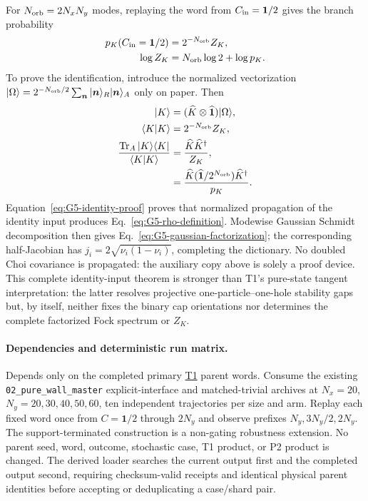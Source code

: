 \documentclass[aps,prx,twocolumn,floatfix,nofootinbib,superscriptaddress,longbibliography]{revtex4-2}
\newcommand{\code}[1]{\texttt{#1}}
\newcommand{\campref}[1]{\hyperref[camp:#1]{#1}}
\begin{document}
For $N_{\rm orb}=2N_xN_y$ modes, replaying the word from
$C_{\rm in}=\mathbf{1}/2$ gives the branch probability
\begin{equation}
 \begin{aligned}
 p_K(C_{\rm in}=\mathbf{1}/2)&=2^{-N_{\rm orb}}Z_K,\\
 \log Z_K&=N_{\rm orb}\log2+\log p_K.
 \end{aligned}
 \label{eq:G5-log-normalization}
\end{equation}
To prove the identification, introduce the normalized vectorization
$|\Omega\rangle=2^{-N_{\rm orb}/2}\sum_{\boldsymbol n}
|\boldsymbol n\rangle_R|\boldsymbol n\rangle_A$ only on paper.  Then
\begin{equation}
 \begin{aligned}
 |K\rangle&=(\widehat K\otimes\widehat{\mathbf{1}})|\Omega\rangle,\\
 \langle K|K\rangle&=2^{-N_{\rm orb}}Z_K,\\
 \frac{\operatorname{Tr}_A|K\rangle\langle K|}{\langle K|K\rangle}
 &=\frac{\widehat K\widehat K^\dagger}{Z_K},\\
 &=\frac{\widehat K(\widehat{\mathbf{1}}/2^{N_{\rm orb}})
       \widehat K^\dagger}{p_K}.
 \end{aligned}
 \label{eq:G5-identity-proof}
\end{equation}
Equation~\eqref{eq:G5-identity-proof} proves that normalized propagation of the identity
input produces Eq.~\eqref{eq:G5-rho-definition}.  Modewise Gaussian Schmidt
decomposition then gives Eq.~\eqref{eq:G5-gaussian-factorization}; the corresponding
half-Jacobian has $j_i=2\sqrt{\nu_i(1-\nu_i)}$, completing the dictionary.  No doubled
Choi covariance is propagated: the auxiliary copy above is solely a proof device.  This complete
identity-input theorem is stronger than T1's pure-state tangent interpretation: the latter
resolves projective one-particle--one-hole stability gaps but, by itself, neither fixes
the binary cap orientations nor determines the complete factorized Fock spectrum or
$Z_K$.

\begin{sloppypar}
\paragraph*{Dependencies and deterministic run matrix.}
Depends only on the completed primary \campref{T1} parent words.  Consume the existing
\code{02\_pure\_wall\_master} explicit-interface and matched-trivial archives at
$N_x=20$, $N_y=20,30,40,50,60$, ten independent trajectories per size and arm.  Replay
each fixed word once from $C=\mathbf{1}/2$ through $2N_y$ and observe prefixes
$N_y,3N_y/2,2N_y$.  The support-terminated construction is a non-gating robustness
extension.  No parent seed, word, outcome, stochastic case, T1 product, or P2 product is
changed.  The derived loader searches the current output first and the completed
 output second,
requiring checksum-valid receipts and identical physical parent identities before
accepting or deduplicating a case/shard pair.
\end{sloppypar}
\end{document}
